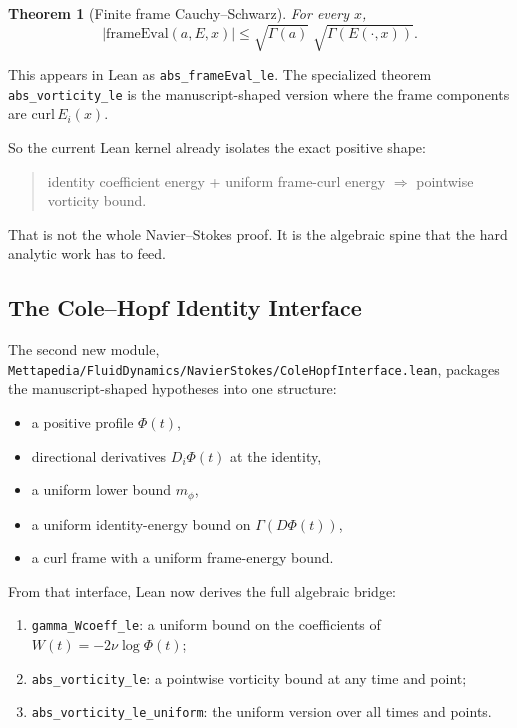 \documentclass[11pt]{article}
\newtheorem{theorem}{Theorem}[section]
\theoremstyle{remark}
\begin{document}
\begin{theorem}[Finite frame Cauchy--Schwarz]
For every \(x\),
\[
  |\mathrm{frameEval}(a,E,x)|
  \le \sqrt{\Gamma(a)}\;\sqrt{\Gamma(E(\cdot,x))}.
\]
\end{theorem}

\noindent
This appears in Lean as \texttt{abs\_frameEval\_le}.  The specialized theorem
\texttt{abs\_vorticity\_le} is the manuscript-shaped version where the frame
components are \(\mathrm{curl}\,E_i(x)\).

So the current Lean kernel already isolates the exact positive shape:
\begin{quote}
identity coefficient energy + uniform frame-curl energy
\(\Longrightarrow\) pointwise vorticity bound.
\end{quote}

That is not the whole Navier--Stokes proof.  It is the algebraic spine that the
hard analytic work has to feed.

\subsection{The Cole--Hopf Identity Interface}

The second new module,
\texttt{Mettapedia/FluidDynamics/NavierStokes/ColeHopfInterface.lean},
packages the manuscript-shaped hypotheses into one structure:
\begin{itemize}[leftmargin=1.5em]
  \item a positive profile \(\Phi(t)\),
  \item directional derivatives \(D_i\Phi(t)\) at the identity,
  \item a uniform lower bound \(m_\phi\),
  \item a uniform identity-energy bound on \(\Gamma(D\Phi(t))\),
  \item a curl frame with a uniform frame-energy bound.
\end{itemize}

From that interface, Lean now derives the full algebraic bridge:
\begin{enumerate}[leftmargin=1.5em]
  \item \texttt{gamma\_Wcoeff\_le}: a uniform bound on the coefficients of
  \(W(t) = -2\nu\log\Phi(t)\);
  \item \texttt{abs\_vorticity\_le}: a pointwise vorticity bound at any time and
  point;
  \item \texttt{abs\_vorticity\_le\_uniform}: the uniform version over all times
  and points.
\end{enumerate}
\end{document}
